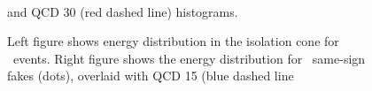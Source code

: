 \begin{figure}[!hbtp]
{
\centering
{}
\\
}
\caption{Left figure shows energy distribution in the isolation cone for \zmm\ events. 
Right figure shows the energy distribution for \wjets\ same-sign fakes (dots), overlaid 
with QCD 15 (blue dashed line} and QCD 30 (red dashed line) histograms.

\end{figure}



